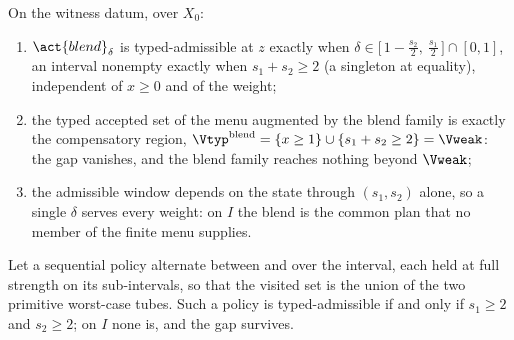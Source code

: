 \begin{theorem}\label{thm:blend}
On the witness datum, over $X_0$:
\begin{enumerate}[label=\textup{(\roman*)},leftmargin=2em]
\item $\act{blend}_\delta$ is typed-admissible at $z$ exactly when $\delta\in\big[\,1-\tfrac{s_2}2,\ \tfrac{s_1}2\,\big]\cap[0,1]$, an interval nonempty exactly when $s_1+s_2\ge2$ (a singleton at equality), independent of $x\ge0$ and of the weight;
\item the typed accepted set of the menu augmented by the blend family is exactly the compensatory region,
$\Vtyp^{\mathrm{blend}}=\{x\ge1\}\cup\{s_1+s_2\ge2\}=\Vweak$: the gap vanishes, and the blend family reaches nothing beyond $\Vweak$;
\item the admissible window depends on the state through $(s_1,s_2)$ alone, so a single $\delta$ serves every weight: on $I$ the blend is the common plan that no member of the finite menu supplies.
\end{enumerate}
\end{theorem}

\begin{proposition}\label{prop:timeshare}
Let a sequential policy alternate between  and  over the interval, each held at full strength on its sub-intervals, so that the visited set is the union of the two primitive worst-case tubes. Such a policy is typed-admissible if and only if $s_1\ge2$ and $s_2\ge2$; on $I$ none is, and the gap survives.
\end{proposition}

